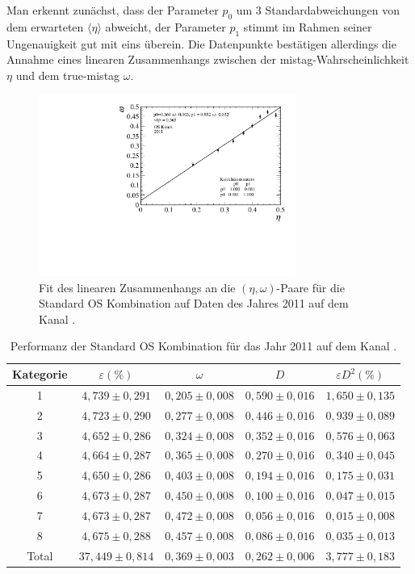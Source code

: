 Man erkennt zunächst, dass der Parameter $p_0$ um \num{3} Standardabweichungen von dem erwarteten $\langle\eta\rangle$ abweicht, der Parameter $p_1$ stimmt im Rahmen seiner Ungenauigkeit gut mit eins überein. Die Datenpunkte bestätigen allerdings die Annahme eines linearen Zusammenhangs zwischen der mistag-Wahrscheinlichkeit $\eta$ und dem true-mistag $\omega$. 
\begin{figure}[htbp]
	\centering
		\includegraphics[width=0.75\textwidth]{fig/2011_OScomb.pdf}
	\caption{Fit des linearen Zusammenhangs an die $(\eta,\omega)$-Paare für die Standard OS Kombination auf Daten des Jahres \num{2011} auf dem Kanal \BdToDpi.}
	\label{fig:2011_OScomb} 
\end{figure} 
\begin{table}[htbp]
	\centering
	\caption{Performanz der Standard OS Kombination für das Jahr \num{2011} auf dem Kanal \BdToDpi.}
	\label{tab:2011_OScomb}
	\begin{tabular}{ccccc}
	\toprule
       Kategorie & $\varepsilon(\%)$ & $\omega$ & $D$ & $\varepsilon D^2(\%)$ \\ 
       \midrule 
       1 & $4{,}739\pm0{,}291$ & $0{,}205\pm0{,}008$ & $0{,}590\pm0{,}016$ & $1{,}650\pm0{,}135$\\
       2 & $4{,}723\pm0{,}290$ & $0{,}277\pm0{,}008$ & $0{,}446\pm0{,}016$ & $0{,}939\pm0{,}089$\\ 
       3 & $4{,}652\pm0{,}286$ & $0{,}324\pm0{,}008$ & $0{,}352\pm0{,}016$ & $0{,}576\pm0{,}063$\\ 
       4 & $4{,}664\pm0{,}287$ & $0{,}365\pm0{,}008$ & $0{,}270\pm0{,}016$ & $0{,}340\pm0{,}045$\\ 
       5 & $4{,}650\pm0{,}286$ & $0{,}403\pm0{,}008$ & $0{,}194\pm0{,}016$ & $0{,}175\pm0{,}031$\\ 
       6 & $4{,}673\pm0{,}287$ & $0{,}450\pm0{,}008$ & $0{,}100\pm0{,}016$ & $0{,}047\pm0{,}015$\\ 
       7 & $4{,}673\pm0{,}287$ & $0{,}472\pm0{,}008$ & $0{,}056\pm0{,}016$ & $0{,}015\pm0{,}008$\\ 
       8 & $4{,}675\pm0{,}288$ & $0{,}457\pm0{,}008$ & $0{,}086\pm0{,}016$ & $0{,}035\pm0{,}013$\\ 
       \midrule
   Total & $37{,}449\pm0{,}814$& $0{,}369\pm0{,}003$ & $0{,}262\pm0{,}006$ & $3{,}777\pm0{,}183$\\ 
   \bottomrule
	\end{tabular}
\end{table}
